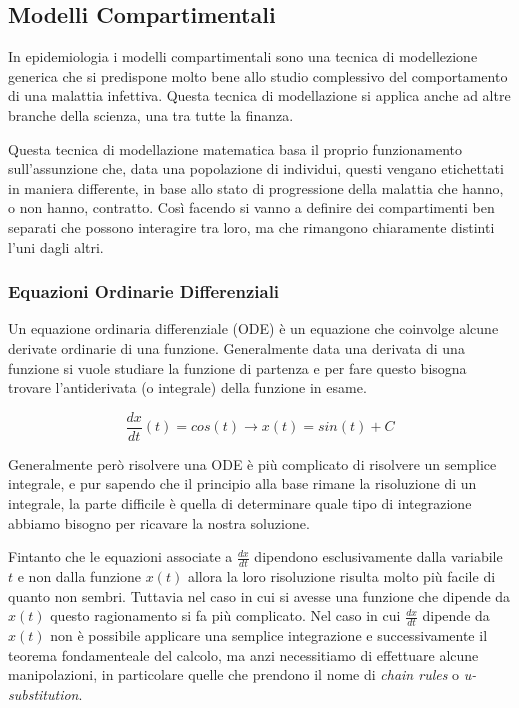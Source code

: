 \subsection{Modelli Compartimentali}
In epidemiologia i modelli compartimentali sono una tecnica di modellezione 
generica che si predispone molto bene allo studio complessivo del comportamento
di una malattia infettiva. 
Questa tecnica di modellazione si applica anche ad altre branche della 
scienza, una tra tutte la finanza.

Questa tecnica di modellazione matematica basa il proprio funzionamento 
sull'assunzione che, data una popolazione di individui, questi vengano 
etichettati in maniera differente, in base allo stato di progressione 
della malattia che hanno, o non hanno, contratto. Così facendo si vanno a 
definire dei compartimenti ben separati che possono interagire tra loro, ma 
che rimangono chiaramente distinti l'uni dagli altri.

\subsubsection*{Equazioni Ordinarie Differenziali}
Un equazione ordinaria differenziale (ODE) è un equazione che coinvolge alcune derivate
ordinarie di una funzione. Generalmente data una 
derivata di una funzione si vuole studiare la funzione di partenza e per fare questo bisogna trovare 
l'antiderivata (o integrale) della funzione in esame. 

$$\frac{dx}{dt}(t) = cos(t) \rightarrow x(t) = sin(t) + C$$

Generalmente però risolvere una ODE è più complicato di risolvere un semplice integrale, e pur sapendo 
che il principio alla base rimane la risoluzione di un integrale, la parte difficile è quella di determinare
quale tipo di integrazione abbiamo bisogno per ricavare la nostra soluzione.

Fintanto che le equazioni associate a $\frac{dx}{dt}$ dipendono esclusivamente dalla variabile $t$ e non 
dalla funzione $x(t)$ allora la loro risoluzione risulta molto più facile di quanto non sembri. Tuttavia 
nel caso in cui si avesse una funzione che dipende da $x(t)$ questo ragionamento si fa più complicato.
Nel caso in cui $\frac{dx}{dt}$ dipende da $x(t)$ non è possibile applicare una semplice integrazione e 
successivamente il teorema fondamenteale del calcolo, ma anzi 
necessitiamo di effettuare alcune manipolazioni, in particolare quelle che prendono il nome di \emph{chain rules}
o \emph{u-substitution}.

